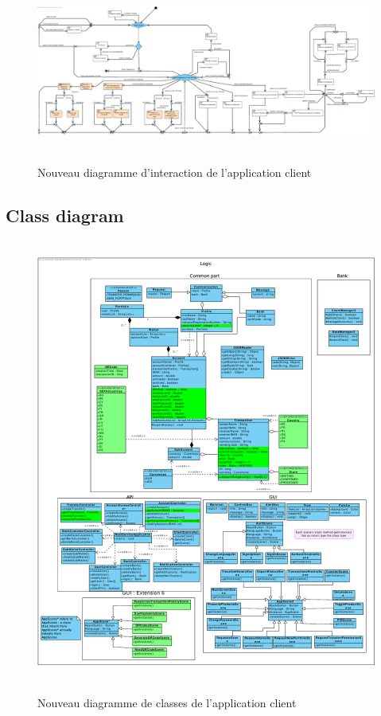 \documentclass[]{report}
\begin{document}


\begin{figure}[h!]
\hspace{-3cm}
\hbox{
	\includegraphics[scale=0.5]{img/Interaction Overview Client - Extension 6.pdf}
}
\caption{Nouveau diagramme d'interaction de l'application client}
\end{figure}

\newpage

\subsection{Class diagram}



\begin{figure}[h!]
\hspace{1.25cm}
\hbox{
	\centering\includegraphics[scale=0.6]{img/Class Client - Extension 6.pdf}
}
\caption{Nouveau diagramme de classes de l'application client}
\end{figure}
\end{document}
